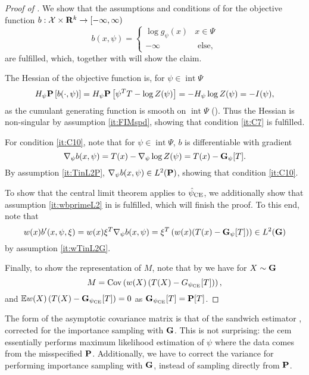 \begin{proof}[Proof of ]
    We show that the assumptions and conditions of  for the objective function $b : \mathcal X \times \R^{k} \to [-\infty, \infty)$ 
    $$
        b(x,\psi) = \begin{cases}
            \log g_{\psi}(x) & x\in\Psi\\
            - \infty & \text{ else,}
        \end{cases}
    $$
    are fulfilled, which, together with  will show the claim. 

    The Hessian of the objective function is, for $\psi \in \operatorname{int} \Psi$
    $$
        H_{\psi} \P \left[ b(\cdot, \psi) \right] = H_{\psi} \P \left[ \psi^{T} T - \log Z(\psi) \right] = -H_{\psi}\log Z(\psi)  = - I(\psi),
    $$
    as the cumulant generating function is smooth on $ \operatorname{int} \Psi$ (). Thus the Hessian is non-singular by assumption \ref{it:FIMspd}, showing that condition \ref{it:C7} is fulfilled.

    For condition \ref{it:C10}, note that for $\psi \in \operatorname{int} \Psi$, $b$ is differentiable with gradient 
    $$
        \nabla_{\psi} b(x, \psi) = T(x) - \nabla_{\psi} \log Z(\psi) = T(x) - \G_{\psi} [T].
    $$
    By assumption \ref{it:TinL2P}, $\nabla_{\psi} b(x,\psi) \in L^{2} (\P)$, showing that condition \ref{it:C10}.

    To show that the central limit theorem applies to $\hpce$, we additionally show that assumption \ref{it:wbprimeL2} in  is fulfilled, which will finish the proof. To this end, note that 
    $$
        w(x)b'(x,\psi,\xi) = w(x) \xi^{T}\nabla_{\psi} b(x, \psi) = \xi^{T} \left( w(x) (T(x) - \G_{\psi}[T]) \right) \in L^{2} (\G)
    $$
    by assumption \ref{it:wTinL2G}.

    Finally, to show the representation of $M$, note that by  we have for $X \sim \G$
    $$
        M = \cov \left( w(X) \left( T(X) - G_{\pce}[T]\right)\right),
    $$
    and $\E w(X) \left( T(X) - \G_{\pce} [T] \right) = 0$ as $\G_{\pce} [T] = \P [T]$.
\end{proof}

The form of the asymptotic covariance matrix is that of the sandwich estimator \citep{White1982Maximum}, corrected for the importance sampling with $\G$. This is not surprising: the \acrshort{cem} essentially performs maximum likelihood estimation of $\psi$ where the data comes from the misspecified $\P$. Additionally, we have to correct the variance for performing importance sampling with $\G$, instead of sampling directly from $\P$.

